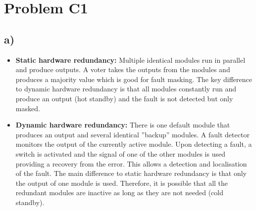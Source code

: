 \documentclass[12pt]{article}
\begin{document}
\lstset{language=C++}

\section*{Problem C1}
\subsection*{a)}
\begin{itemize}
\item \textbf{Static hardware redundancy:} Multiple identical modules run in parallel and produce outputs. A voter takes the outputs from the modules and produces a majority value which is good for fault masking. The key difference to dynamic hardware redundancy is that all modules constantly run and produce an output (hot standby) and the fault is not detected but only masked. 

\item \textbf{Dynamic hardware redundancy:} There is one default module that produces an output and several identical ''backup'' modules. A fault detector monitors the output of the currently active module. Upon detecting a fault, a switch is activated and the signal of one of the other modules is used providing a recovery from the error. This allows a detection and localisation of the fault. The main difference to static hardware redundancy is that only the output of one module is used. Therefore, it is possible that all the redundant modules are inactive as long as they are not needed (cold standby).
\end{itemize}
\end{document}
